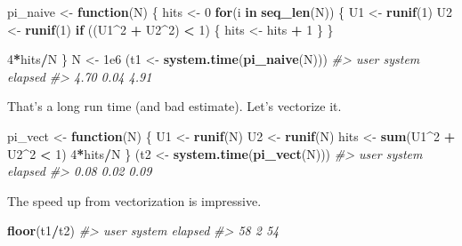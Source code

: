 \documentclass[]{book}
\newenvironment{Shaded}{\begin{snugshade}}{\end{snugshade}}
\newcommand{\KeywordTok}[1]{\textcolor[rgb]{0.13,0.29,0.53}{\textbf{#1}}}
\newcommand{\DecValTok}[1]{\textcolor[rgb]{0.00,0.00,0.81}{#1}}
\newcommand{\FloatTok}[1]{\textcolor[rgb]{0.00,0.00,0.81}{#1}}
\newcommand{\StringTok}[1]{\textcolor[rgb]{0.31,0.60,0.02}{#1}}
\newcommand{\CommentTok}[1]{\textcolor[rgb]{0.56,0.35,0.01}{\textit{#1}}}
\newcommand{\ControlFlowTok}[1]{\textcolor[rgb]{0.13,0.29,0.53}{\textbf{#1}}}
\newcommand{\OperatorTok}[1]{\textcolor[rgb]{0.81,0.36,0.00}{\textbf{#1}}}
\newcommand{\NormalTok}[1]{#1}
\theoremstyle{definition}
\theoremstyle{definition}
\theoremstyle{definition}
\theoremstyle{remark}
\begin{document}
\begin{Shaded}
\begin{Highlighting}[]
\NormalTok{pi_naive <-}\StringTok{ }\ControlFlowTok{function}\NormalTok{(N) \{}
\NormalTok{  hits <-}\StringTok{ }\DecValTok{0}
  \ControlFlowTok{for}\NormalTok{(i }\ControlFlowTok{in} \KeywordTok{seq_len}\NormalTok{(N)) \{}
\NormalTok{    U1 <-}\StringTok{ }\KeywordTok{runif}\NormalTok{(}\DecValTok{1}\NormalTok{)}
\NormalTok{    U2 <-}\StringTok{ }\KeywordTok{runif}\NormalTok{(}\DecValTok{1}\NormalTok{)}
    \ControlFlowTok{if}\NormalTok{ ((U1}\OperatorTok{^}\DecValTok{2} \OperatorTok{+}\StringTok{ }\NormalTok{U2}\OperatorTok{^}\DecValTok{2}\NormalTok{) }\OperatorTok{<}\StringTok{ }\DecValTok{1}\NormalTok{) \{}
\NormalTok{      hits <-}\StringTok{ }\NormalTok{hits }\OperatorTok{+}\StringTok{ }\DecValTok{1}
\NormalTok{    \}}
\NormalTok{  \}}
  
  \DecValTok{4}\OperatorTok{*}\NormalTok{hits}\OperatorTok{/}\NormalTok{N}
\NormalTok{\}}
\NormalTok{N <-}\StringTok{ }\FloatTok{1e6}
\NormalTok{(t1 <-}\StringTok{ }\KeywordTok{system.time}\NormalTok{(}\KeywordTok{pi_naive}\NormalTok{(N)))}
\CommentTok{#>    user  system elapsed }
\CommentTok{#>    4.70    0.04    4.91}
\end{Highlighting}
\end{Shaded}

That's a long run time (and bad estimate). Let's vectorize it.

\begin{Shaded}
\begin{Highlighting}[]
\NormalTok{pi_vect <-}\StringTok{ }\ControlFlowTok{function}\NormalTok{(N) \{}
\NormalTok{  U1 <-}\StringTok{ }\KeywordTok{runif}\NormalTok{(N)}
\NormalTok{  U2 <-}\StringTok{ }\KeywordTok{runif}\NormalTok{(N)}
\NormalTok{  hits <-}\StringTok{ }\KeywordTok{sum}\NormalTok{(U1}\OperatorTok{^}\DecValTok{2} \OperatorTok{+}\StringTok{ }\NormalTok{U2}\OperatorTok{^}\DecValTok{2} \OperatorTok{<}\StringTok{ }\DecValTok{1}\NormalTok{)}
  \DecValTok{4}\OperatorTok{*}\NormalTok{hits}\OperatorTok{/}\NormalTok{N}
\NormalTok{\}}
\NormalTok{(t2 <-}\StringTok{ }\KeywordTok{system.time}\NormalTok{(}\KeywordTok{pi_vect}\NormalTok{(N)))}
\CommentTok{#>    user  system elapsed }
\CommentTok{#>    0.08    0.02    0.09}
\end{Highlighting}
\end{Shaded}

The speed up from vectorization is impressive.

\begin{Shaded}
\begin{Highlighting}[]
\KeywordTok{floor}\NormalTok{(t1}\OperatorTok{/}\NormalTok{t2)}
\CommentTok{#>    user  system elapsed }
\CommentTok{#>      58       2      54}
\end{Highlighting}
\end{Shaded}
\end{document}
